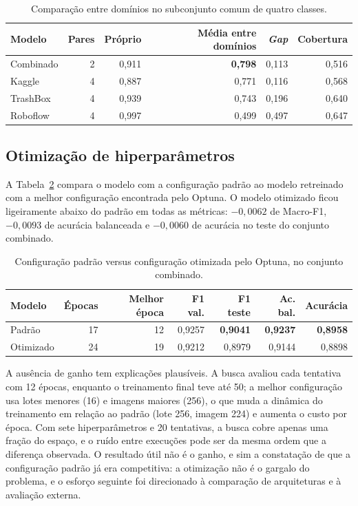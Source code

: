 \documentclass[11pt,a4paper]{article}
\begin{document}
	\begin{table}[htbp]
		\centering
		\small
		\caption{Comparação entre domínios no subconjunto comum de quatro classes.}
		\label{tab:cross}
		\begin{tabular}{lrrrrr}
			\toprule
			\textbf{Modelo} & \textbf{Pares} & \textbf{Próprio} & \textbf{Média entre domínios} & \textbf{\emph{Gap}} & \textbf{Cobertura} \\
			\midrule
			Combinado & 2 & 0,911 & \textbf{0,798} & 0,113 & 0,516 \\
			Kaggle & 4 & 0,887 & 0,771 & 0,116 & 0,568 \\
			TrashBox & 4 & 0,939 & 0,743 & 0,196 & 0,640 \\
			Roboflow & 4 & 0,997 & 0,499 & 0,497 & 0,647 \\
			\bottomrule
		\end{tabular}
	\end{table}

	\subsection{Otimização de hiperparâmetros}
	\label{sec:optuna}
	
	A Tabela~\ref{tab:optuna} compara o modelo com a configuração padrão ao modelo retreinado com a melhor configuração encontrada pelo Optuna. O modelo otimizado ficou ligeiramente abaixo do padrão em todas as métricas: $-0{,}0062$ de Macro-F1, $-0{,}0093$ de acurácia balanceada e $-0{,}0060$ de acurácia no teste do conjunto combinado.
	
	\begin{table}[htbp]
		\centering
		\small
		\caption{Configuração padrão versus configuração otimizada pelo Optuna, no conjunto combinado.}
		\label{tab:optuna}
		\begin{tabular}{lrrrrrr}
			\toprule
			\textbf{Modelo} & \textbf{Épocas} & \textbf{Melhor época} & \textbf{F1 val.} & \textbf{F1 teste} & \textbf{Ac. bal.} & \textbf{Acurácia} \\
			\midrule
			Padrão & 17 & 12 & 0,9257 & \textbf{0,9041} & \textbf{0,9237} & \textbf{0,8958} \\
			Otimizado & 24 & 19 & 0,9212 & 0,8979 & 0,9144 & 0,8898 \\
			\bottomrule
		\end{tabular}
	\end{table}
	
	A ausência de ganho tem explicações plausíveis. A busca avaliou cada tentativa com 12 épocas, enquanto o treinamento final teve até 50; a melhor configuração usa lotes menores (16) e imagens maiores (256), o que muda a dinâmica do treinamento em relação ao padrão (lote 256, imagem 224) e aumenta o custo por época. Com sete hiperparâmetros e 20 tentativas, a busca cobre apenas uma fração do espaço, e o ruído entre execuções pode ser da mesma ordem que a diferença observada. O resultado útil não é o ganho, e sim a constatação de que a configuração padrão já era competitiva: a otimização não é o gargalo do problema, e o esforço seguinte foi direcionado à comparação de arquiteturas e à avaliação externa.
	
\end{document}
